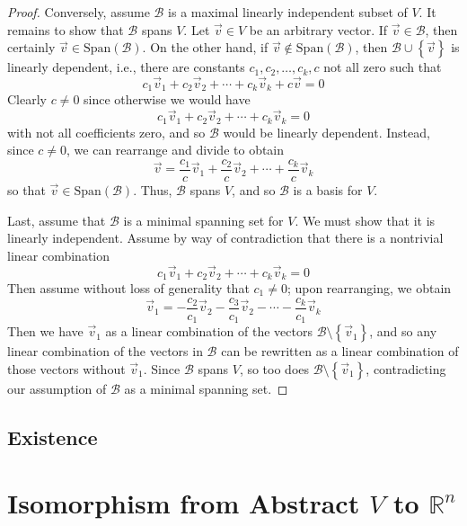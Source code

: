 \begin{proof}
Conversely, assume $\mathcal{B}$ is a maximal linearly independent subset of $V$. It remains to show that $\mathcal{B}$ spans $V$. Let $\vec{v} \in V$ be an arbitrary vector. If $\vec{v} \in \mathcal{B}$, then certainly $\vec{v} \in \text{Span} \left( \mathcal{B}\right)$. On the other hand, if $\vec{v} \notin \text{Span} \left( \mathcal{B}\right)$, then $\mathcal{B}\cup \left\{ \vec{v} \right\}$ is linearly dependent, i.e., there are constants $c_1,c_2,\ldots, c_k, c$ not all zero such that \[ c_1 \vec{v}_1 + c_2 \vec{v}_2 + \cdots + c_k \vec{v}_k + c \vec{v} = 0 \] Clearly $c \neq 0$ since otherwise we would have \[ c_1 \vec{v}_1 + c_2 \vec{v}_2 + \cdots + c_k \vec{v}_k  = 0 \] with not all coefficients zero, and so $\mathcal{B}$ would be linearly dependent. Instead, since $c\neq 0$, we can rearrange and divide to obtain \[ \vec{v} = \frac{c_1}{c} \vec{v}_1 + \frac{c_2}{c} \vec{v}_2 + \cdots + \frac{c_k}{c} \vec{v}_k \] so that $\vec{v} \in \text{Span} \left(\mathcal{B}\right)$. Thus, $\mathcal{B}$ spans $V$, and so $\mathcal{B}$ is a basis for $V$.

Last, assume that $\mathcal{B}$ is a minimal spanning set for $V$. We must show that it is linearly independent. Assume by way of contradiction that there is a nontrivial linear combination \[ c_1 \vec{v}_1 + c_2 \vec{v}_2 + \cdots + c_k \vec{v}_k = 0 \] Then assume without loss of generality that $c_1 \neq 0$; upon rearranging, we obtain \[ \vec{v}_1 = -\frac{c_2}{c_1} \vec{v}_2 - \frac{c_3}{c_1} \vec{v}_2 - \cdots - \frac{c_k}{c_1} \vec{v}_k \] Then we have $\vec{v}_1$ as a linear combination of the vectors $\mathcal{B}\setminus \left\{ \vec{v}_1 \right\}$, and so any linear combination of the vectors in $\mathcal{B}$ can be rewritten as a linear combination of those vectors without $\vec{v}_1$. Since $\mathcal{B}$ spans $V$, so too does $\mathcal{B}\setminus \left\{ \vec{v}_1\right\}$, contradicting our assumption of $\mathcal{B}$ as a minimal spanning set.
\end{proof}





\subsection{Existence}

\section{Isomorphism from Abstract $V$ to $\mathbb{R}^n$}



